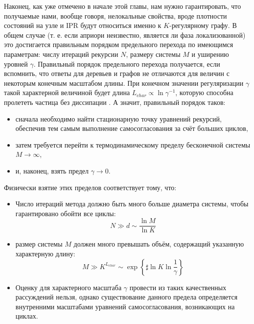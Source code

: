Наконец, как уже отмечено в начале этой главы, нам нужно гарантировать, что получаемые нами, вообще говоря, нелокальные свойства, вроде плотности состояний на узле и IPR будут относиться именно к $K$-регулярному графу. В общем случае (т. е. если априори неизвестно, является ли фаза локализованной) это достигается правильным порядком предельного перехода по имеющимся параметрам: числу итераций рекурсии $N$, размеру системы $M$ и уширению уровней $\gamma$. Правильный порядок предельного перехода получается, если вспомнить, что ответы для деревьев и графов не отличаются для величин с некоторым конечным масштабом длины. При конечном значении регуляризации $\gamma$ такой характерной величиной будет длина $L_{char} \propto \ln \gamma^{-1}$, которую способна пролететь частица без диссипации \cite{Tikhonov_2016}. А значит, правильный порядок таков:
\begin{itemize}
	\item сначала необходимо найти стационарную точку уравнений рекурсий, обеспечив тем самым выполнение самосогласования за счёт больших циклов,
	\item затем требуется перейти к термодинамическому пределу бесконечной системы $M \rightarrow \infty$,
	\item и, наконец, взять предел $\gamma \rightarrow 0$.
\end{itemize}
Физически взятие этих пределов соответствует тому, что:
\begin{itemize}
	\item Число итераций метода должно быть много больше диаметра системы, чтобы гарантировано обойти все циклы: 
	$$N \gg d \sim \frac{ \ln M}{\ln K} $$
	\item размер системы $M$ должен много превышать объём, содержащий указанную характерную длину:
	$$
	M \gg K^{L_{char}} \sim \exp \left\{ \sharp \ln K \ln \frac{1}{\gamma} \right\}
	$$
	\item Оценку для характерного масштаба $\gamma$ провести из таких качественных рассуждений нельзя, однако существование данного предела определяется внутренними масштабами уравнений самосогласования, возникающих на циклах. 
\end{itemize}

